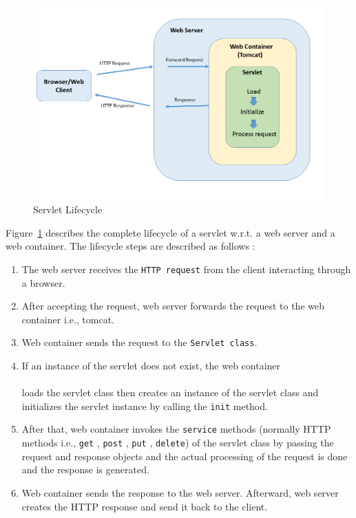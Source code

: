 \begin{figure}
	\includegraphics[width=1\textwidth]{figures/Server_Servlet}
	\caption{Servlet Lifecycle}
	\label{fig:Server_Servlet}
\end{figure}

Figure~\ref{fig:Server_Servlet} describes the complete lifecycle of a servlet w.r.t. a web server and a web container. The lifecycle steps are described as follows \cite{servlet}:
\begin{enumerate}
	\item {The web server receives the \texttt{HTTP request} from the client interacting through a browser.}
	\item {After accepting the request, web server forwards the request to the web container i.e., tomcat.}
	\item {Web container sends the request to the \texttt{Servlet class}.}
	\item {If an instance of the servlet does not exist, the web container}\\\\
	loads the servlet class then creates an instance of the servlet class and initializes the servlet instance by calling the \texttt{init} method.
	\item {After that, web container invokes the \texttt{service} methods (normally HTTP methods i.e., \texttt{get} , \texttt{post} , \texttt{put} , \texttt{delete}) of the servlet class by passing the request and response objects and the actual processing of the request is done and the response is generated.}
	\item {Web container sends the response to the web server. Afterward, web server creates the HTTP response and send it back to the client.}
\end{enumerate}

